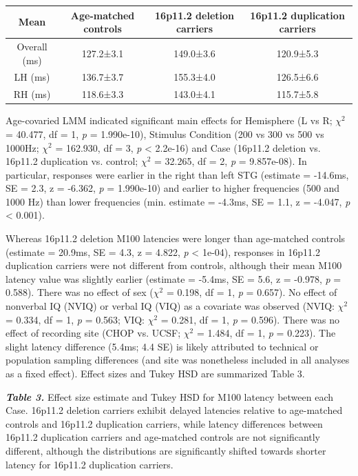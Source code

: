 \documentclass{article}
\begin{document}
\bigskip

\begin{tabular}{|c|c|c|c|}
\hline
Mean & Age-matched controls & 16p11.2 deletion carriers & 16p11.2 duplication carriers\\
\hline
Overall (ms) &	127.2±3.1	& 149.0±3.6 &	120.9±5.3\\
\hline
LH (ms) & 136.7±3.7	& 155.3±4.0 & 126.5±6.6\\
\hline
RH (ms) & 118.6±3.3 & 143.0±4.1 & 115.7±5.8\\
\hline
\end{tabular}

\bigskip

Age-covaried LMM indicated significant main effects for Hemisphere (L vs R; $\chi^2$ = 40.477, df = 1, \emph{p} = 1.990e-10), Stimulus Condition (200 vs 300 vs 500 vs 1000Hz; $\chi^2$ = 162.930, df = 3, \emph{p} < 2.2e-16) and Case (16p11.2 deletion vs. 16p11.2 duplication vs. control; $\chi^2$ = 32.265, df = 2, \emph{p} = 9.857e-08). In particular, responses were earlier in the right than left STG (estimate = -14.6ms, SE = 2.3, z = -6.362, \emph{p} = 1.990e-10) and earlier to higher frequencies (500 and 1000 Hz) than lower frequencies (min. estimate = -4.3ms, SE = 1.1, z = -4.047, \emph{p} < 0.001).   

\medskip

Whereas 16p11.2 deletion M100 latencies were longer than age-matched controls (estimate = 20.9ms, SE = 4.3, z = 4.822, \emph{p} < 1e-04), responses in 16p11.2 duplication carriers were not different from controls, although their mean M100 latency value was slightly earlier (estimate = -5.4ms, SE = 5.6, z = -0.978, \emph{p} = 0.588). There was no effect of sex ($\chi^2$ = 0.198, df = 1, \emph{p} = 0.657). No effect of nonverbal IQ (NVIQ) or verbal IQ (VIQ) as a covariate was observed (NVIQ: $\chi^2$ = 0.334, df = 1, \emph{p} = 0.563; VIQ: $\chi^2$ = 0.281, df = 1, \emph{p} = 0.596). There was no effect of recording site (CHOP vs. UCSF; $\chi^2$ = 1.484, df = 1, \emph{p} = 0.223). The slight latency difference (5.4ms; 4.4 SE)  is likely attributed to technical or population sampling differences (and site was nonetheless included in all analyses as a fixed effect).  Effect sizes and Tukey HSD are summarized Table 3.

\bigskip

\emph{\textbf{Table 3.}} Effect size estimate and Tukey HSD for M100 latency between each Case. 16p11.2 deletion carriers exhibit delayed latencies relative to age-matched controls and 16p11.2 duplication carriers, while latency differences between 16p11.2 duplication carriers and age-matched controls are not significantly different, although the distributions are significantly shifted towards shorter latency for 16p11.2 duplication carriers.  
\end{document}
